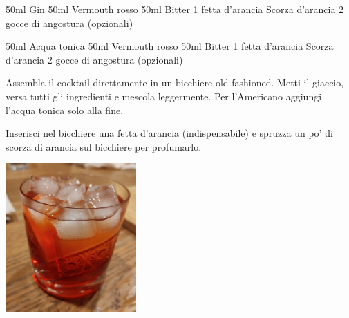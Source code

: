 \cooktime[]{-}%
\begin{ingreds}
\ingredients[Negroni]
	50ml Gin 
	50ml Vermouth rosso 
	50ml Bitter 
	1 fetta d'arancia 
	Scorza d'arancia
	2 gocce di angostura (opzionali) 

\columnbreak

\ingredients[Americano]
	50ml Acqua tonica
	50ml Vermouth rosso
	50ml Bitter
	1 fetta d'arancia
	Scorza d'arancia
	2 gocce di angostura (opzionali)

\end{ingreds}

\begin{method}
Assembla il cocktail direttamente in un bicchiere old fashioned. Metti il giaccio, versa tutti gli ingredienti e mescola leggermente. Per l'Americano aggiungi l'acqua tonica solo alla fine.

Inserisci nel bicchiere una fetta d'arancia (indispensabile) e spruzza un po' di scorza di arancia sul bicchiere per profumarlo.


\end{method}


\begin{center}
\includegraphics[width=5cm]{img/negroni.jpg}
\end{center}


